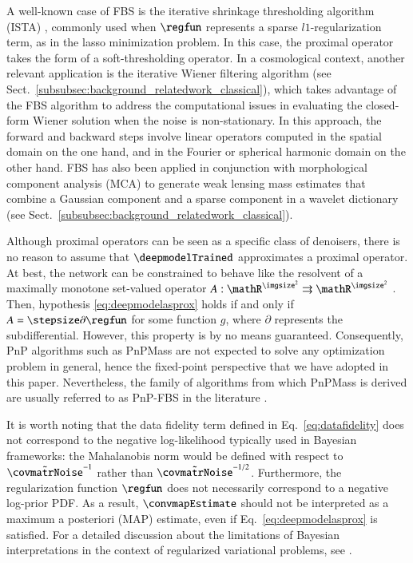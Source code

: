 \documentclass{aa}
\begin{document}
A well-known case of FBS is the iterative shrinkage thresholding algorithm (ISTA) \citep{Blumensath2008}, commonly used when $\regfun$ represents a sparse $l1$-regularization term, as in the lasso minimization problem. In this case, the proximal operator takes the form of a soft-thresholding operator. In a cosmological context, another relevant application is the iterative Wiener filtering algorithm \citep{Bobin2012} (see Sect.~\ref{subsubsec:background_relatedwork_classical}), which takes advantage of the FBS algorithm to address the computational issues in evaluating the closed-form Wiener solution when the noise is non-stationary. In this approach, the forward and backward steps involve linear operators computed in the spatial domain on the one hand, and in the Fourier or spherical harmonic domain on the other hand. FBS has also been applied in conjunction with morphological component analysis (MCA) \citep{Bobin2007} to generate weak lensing mass estimates that combine a Gaussian component and a sparse component in a wavelet dictionary \citep{Starck2021} (see Sect.~\ref{subsubsec:background_relatedwork_classical}).

Although proximal operators can be seen as a specific class of denoisers, there is no reason to assume that $\deepmodelTrained$ approximates a proximal operator. At best, the network can be constrained to behave like the resolvent of a maximally monotone set-valued operator $A: \mathR^{\imgsize^2} \rightrightarrows \mathR^{\imgsize^2}$ \citep{Terris2020}. Then, hypothesis \eqref{eq:deepmodelasprox} holds if and only if $A = \stepsize\partial\regfun$ for some function $g$, where $\partial$ represents the subdifferential. However, this property is by no means guaranteed. Consequently, PnP algorithms such as PnPMass are not expected to solve any optimization problem in general, hence the fixed-point perspective that we have adopted in this paper. Nevertheless, the family of algorithms from which PnPMass is derived are usually referred to as PnP-FBS in the literature \citep{Ryu2019,Ebner2024}.

It is worth noting that the data fidelity term defined in Eq.~\eqref{eq:datafidelity} does not correspond to the negative log-likelihood typically used in Bayesian frameworks: the Mahalanobis norm would be defined with respect to $\tilde\covmatrNoise^{-1}$ rather than $\tilde\covmatrNoise^{-1/2}$. Furthermore, the regularization function $\regfun$ does not necessarily correspond to a negative log-prior PDF. As a result, $\convmapEstimate$ should not be interpreted as a maximum a posteriori (MAP) estimate, even if Eq.~\eqref{eq:deepmodelasprox} is satisfied. For a detailed discussion about the limitations of Bayesian interpretations in the context of regularized variational problems, see \citet{Starck2013}.
\end{document}
